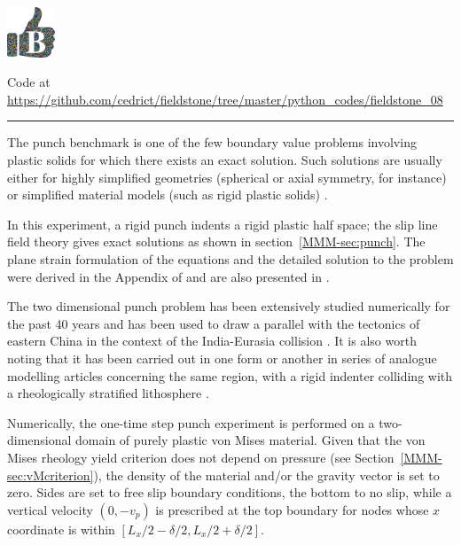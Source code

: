 
\includegraphics[height=1.5cm]{images/pictograms/benchmark}



\begin{center}
Code at \url{https://github.com/cedrict/fieldstone/tree/master/python_codes/fieldstone_08}
\end{center}

\par\noindent\rule{\textwidth}{0.4pt}

The punch benchmark is one of the few boundary value problems involving plastic solids for which there exists an exact solution. 
Such solutions are usually either for highly simplified geometries (spherical or axial symmetry, for instance) or simplified material models (such as rigid plastic solids) \cite{kacha04}.

In this experiment, a rigid punch indents a rigid plastic half space; the slip line field theory gives 
exact solutions as shown in section~\ref{MMM-sec:punch}. 
The plane strain formulation of the equations and the detailed solution to the problem were derived in the Appendix of \cite{thfb08} and are also presented in \cite{gepd98}.

The two dimensional punch problem has been extensively studied numerically for the past 40 years 
\cite{zihl75,zihp95,chpe01,chan99,huhy99,yuti06,bufs08,raab07} and has been used to draw a parallel 
with the tectonics of eastern China in the context of the 
India-Eurasia collision \cite{tamo76,mota77}.
It is also worth noting that it has been carried out in one form or another in series of 
analogue modelling articles 
concerning the same region, with a rigid indenter colliding with a rheologically stratified 
lithosphere \cite{peta88,daco88,jodc90}.
 
Numerically, the one-time step punch experiment is performed on a two-dimensional
domain of purely plastic von Mises material. 
Given that the von Mises rheology yield criterion does not depend on pressure
(see Section~\ref{MMM-sec:vMcriterion}), the density of the material and/or the gravity 
vector is set to zero. Sides are set to free slip boundary conditions, the bottom to no slip, 
while a vertical velocity $(0,-v_p)$ is prescribed at the top boundary for nodes 
whose $x$ coordinate is within $[L_x/2-\delta/2,L_x/2+\delta/2]$. 

